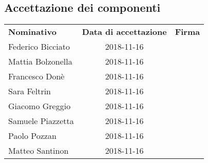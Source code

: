 \subsection{Accettazione dei componenti}
\begin{table}[H]
	\centering\renewcommand{\arraystretch}{1.5}
	
	\begin{tabular}{l c c}
		
		
		\rowcolorhead 
		{ \textbf{Nominativo}} &
		{ \textbf{Data di accettazione}} &
		{ \textbf{Firma}}  \\
		
		\rowcolorlight
		Federico Bicciato & 2018-11-16 &   \\ 
		\rowcolordark
		Mattia Bolzonella & 2018-11-16 &   \\ 
		\rowcolorlight
		Francesco Donè & 2018-11-16 &   \\ 
		\rowcolordark
		Sara Feltrin & 2018-11-16 &   \\ 
		\rowcolorlight
		Giacomo Greggio & 2018-11-16 &   \\ 
		\rowcolordark
		Samuele Piazzetta & 2018-11-16 &   \\ 
		\rowcolorlight
		Paolo Pozzan & 2018-11-16 &   \\ 
		\rowcolordark
		Matteo Santinon & 2018-11-16 &   \\ 
	\end{tabular}
\end{table}

